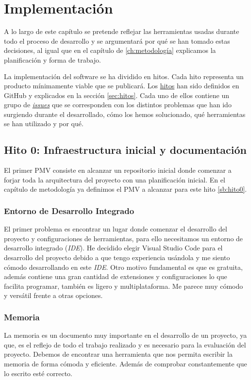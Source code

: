 \UseRawInputEncoding
\chapter{Implementación}

A lo largo de este capítulo se pretende reflejar las herramientas usadas durante todo el proceso de desarrollo y
se argumentará por qué se han tomado estas decisiones, al igual que en el capítulo de \ref{ch:metodología} explicamos
la planificación y forma de trabajo.

La implementación del software se ha dividido en hitos. Cada hito representa un producto mínimamente viable que se publicará.
Los \href{https://github.com/RubenDelgadoPareja/TFG-Triage-Inteligente-Consulta-Medica/milestones}{hitos} han sido definidos en GitHub y explicados en la sección \ref{sec:hitos}.
Cada uno de ellos contiene un grupo de \href{https://github.com/RubenDelgadoPareja/TFG-Triage-Inteligente-Consulta-Medica/issues}{\textit{issues}} que se corresponden
con los distintos problemas que han ido surgiendo durante el desarrollado, cómo los hemos solucionado, qué herramientas se han utilizado y por qué.

\section{Hito 0: Infraestructura inicial y documentación}

El primer PMV consiste en alcanzar un repositorio inicial donde comenzar a forjar toda la arquitectura del proyecto con una planificación inicial.
En el capítulo de metodología ya definimos el PMV a alcanzar para este hito \ref{sb:hito0}.

\subsection{Entorno de Desarrollo Integrado}
El primer problema es encontrar un lugar donde comenzar el desarrollo del proyecto y configuraciones de herramientas, para ello necesitamos un entorno de desarrollo integrado (\textit{IDE}).
He decidido elegir Visual Studio Code para el desarrollo del proyecto debido a que tengo experiencia usándola y me siento cómodo desarrollando en este {\textit{IDE}}.
Otro motivo fundamental es que es gratuita, además contiene una gran cantidad de extensiones y configuraciones lo que facilita programar, también es ligero y multiplataforma.
Me parece muy cómodo y versátil frente a otras opciones.

\subsection{Memoria}
La memoria es un documento muy importante en el desarrollo de un proyecto, ya que, es el reflejo de todo el trabajo realizado y es necesario para la evaluación del proyecto.
Debemos de encontrar una herramienta que nos permita escribir la memoria de forma cómoda y eficiente. Además de comprobar constantemente que lo escrito esté correcto.

